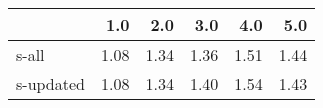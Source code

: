 \begin{tabular}{lrrrrr}
\toprule
{} &  1.0 &  2.0 &  3.0 &  4.0 &  5.0 \\
\midrule
s-all     & 1.08 & 1.34 & 1.36 & 1.51 & 1.44 \\
s-updated & 1.08 & 1.34 & 1.40 & 1.54 & 1.43 \\
\bottomrule
\end{tabular}

